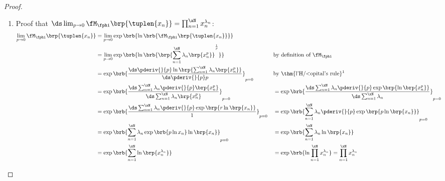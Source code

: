\begin{proof}
\begin{enumerate}
  \item Proof that $\ds\lim_{p\to0} \fM_\fphi\brp{\tuplen{x_n}} = \prod_{n=1}^{\xN} x_n^{\lambda_n}$:
    \begin{align*}
      \lim_{p\to0} \fM_\fphi\brp{\tuplen{x_n}}
        &= \lim_{p\to0} \exp\brb{\ln\brb{\fM_\fphi\brp{\tuplen{x_n}}}} 
      \\&= \lim_{p\to0} \exp\brb{\ln\brb{\brp{\sum_{n=1}^{\xN}\lambda_n\brp{x_n^p}}^\frac{1}{p}}}
        && \text{by definition of $\fM_\fphi$}
      \\&= \exp\brb{\frac{\ds\pderiv{}{p}\ln\brp{\sum_{n=1}^{\xN}\lambda_n\brp{x_n^p}}}{\ds\pderiv{}{p}p}}_{p=0}
        && \text{by \thm{l'H{/<o}pital's rule}\footnotemark}
      \\&= \exp\brb{\frac{\ds\sum_{n=1}^{\xN}\lambda_n\pderiv{}{p}\brp{x_n^p}}
                         {\ds\sum_{n=1}^{\xN}\lambda_n\brp{x_n^p}}
                   }_{p=0}
       &&= \exp\brb{\frac{\ds\sum_{n=1}^{\xN}\lambda_n\pderiv{}{p}\exp\brp{\ln\brp{x_n^p}}}
                         {\ds\sum_{n=1}^{\xN}\lambda_n}
                   }_{p=0}
      \\&= \exp\brb{\frac{\ds\sum_{n=1}^{\xN}\lambda_n\pderiv{}{p}\exp\brp{r\ln\brp{x_n}}}
                         {1}
                   }_{p=0}
       &&= \exp\brb{\sum_{n=1}^{\xN}\lambda_n\pderiv{}{p}\exp\brp{p\ln\brp{x_n}}
                   }_{p=0}
      \\&= \exp\brb{\sum_{n=1}^{\xN}\lambda_n\exp\brb{p\ln{x_n}}\ln\brp{x_n}
                   }_{p=0}
       &&= \exp\brb{\sum_{n=1}^{\xN}\lambda_n\ln\brp{x_n}}
      \\&= \exp\brb{\sum_{n=1}^{\xN}\ln\brp{x_n^{\lambda_n}}}
       &&= \exp\brb{\ln\prod_{n=1}^{\xN}x_n^{\lambda_n}}
         = \prod_{n=1}^{\xN} x_n^{\lambda_n}
    \end{align*}
\end{enumerate}
\end{proof}






